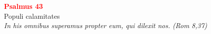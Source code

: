 


\def\greinitialformat#1{%
{\fontsize{39}{39}\selectfont #1}%
}




\vspace{0.3cm}
\begin{center}
 \textcolor{red}{\large \bf Psalmus 43}\\
Populi calamitates\\
\textit{\small In his omnibus superamus propter eum, qui dilexit nos. (Rom 8,37)}
\end{center}
